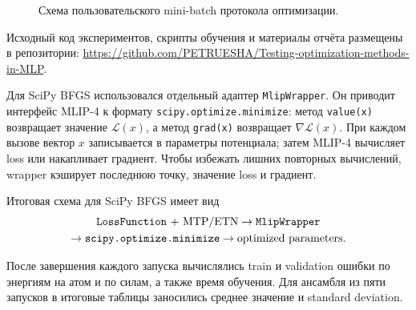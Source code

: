 \begin{figure}[H]
    \centering
    \caption{Схема пользовательского mini-batch протокола оптимизации.}
    \label{fig:custom-optimization-loop}
\end{figure}

Исходный код экспериментов, скрипты обучения и материалы отчёта размещены в репозитории:
\url{https://github.com/PETRUESHA/Testing-optimization-methods-in-MLP}.

Для SciPy BFGS использовался отдельный адаптер \texttt{MlipWrapper}. Он приводит интерфейс MLIP-4 к формату \texttt{scipy.optimize.minimize}: метод \texttt{value(x)} возвращает значение \(\mathcal L(x)\), а метод \texttt{grad(x)} возвращает \(\nabla\mathcal L(x)\). При каждом вызове вектор \(x\) записывается в параметры потенциала; затем MLIP-4 вычисляет loss или накапливает градиент. Чтобы избежать лишних повторных вычислений, wrapper кэширует последнюю точку, значение loss и градиент.

Итоговая схема для SciPy BFGS имеет вид
\[
    \begin{array}{c}
        \text{\texttt{LossFunction} + MTP/ETN}
        \rightarrow
        \text{\texttt{MlipWrapper}}
        \\[0.3em]
        \rightarrow
        \text{\texttt{scipy.optimize.minimize}}
        \rightarrow
        \text{optimized parameters}.
    \end{array}
\]

После завершения каждого запуска вычислялись train и validation ошибки по энергиям на атом и по силам, а также время обучения. Для ансамбля из пяти запусков в итоговые таблицы заносились среднее значение и standard deviation.
